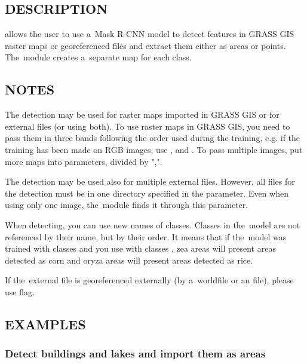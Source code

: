 \subsection*{DESCRIPTION}
 allows the user to use a~Mask R-CNN
model to detect features in GRASS GIS raster maps or georeferenced files and
extract them either as areas or
points. The~module creates a~separate map for each class. 

\subsection*{NOTES}

The detection may be used for raster maps imported in GRASS GIS or for external
files (or using both). To use raster maps in GRASS GIS, you need to pass them
in three bands following the order used during the training, e.g. if the
training has been made on RGB images, use ,
 and . To
pass multiple images, put more maps into  parameters,
divided by ",".

The detection may be used also for multiple external files. However, all files
for the detection must be in one directory specified in the
 parameter. Even when using only one
image, the~module finds it through this parameter. 

When detecting, you can use new names of classes. Classes in the~model are not
referenced by their name, but by their order. It means that if the~model was
trained with classes  and you use
 with classes
, zea areas will present areas detected as corn
and oryza areas will present areas detected as rice. 

If the~external file is georeferenced externally (by a~worldfile or an
 file), please use  flag. 

\subsection*{EXAMPLES}
\subsubsection*{Detect buildings and lakes and import them as areas}


